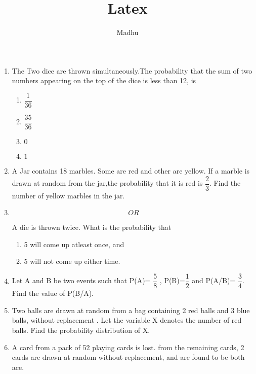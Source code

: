 \documentclass[a4paper,12pt]{article}
\begin{document}
\title{Latex}
\author{Madhu}
\maketitle
{}

\begin{enumerate}

\item The Two dice are thrown simultaneously.The probability that the sum of two numbers appearing on the top of the dice is less than 12, is

\begin{enumerate}
\item $ \dfrac{1}{36} $ \\
\item $ \dfrac{35}{36} $ \\
\item $ 0 $\\
\item $ 1 $\\
\end{enumerate}


\item A Jar contains 18 marbles. Some are red and other are yellow. If a marble is drawn at random from the jar,the probability that it is red is $ \dfrac{2}{3} $. Find the number of yellow marbles in the jar.

\item [ ]$$ OR $$

A die is thrown twice. What is the probability that 
\begin{enumerate}
\item 5 will come up atleast once, and
\item 5 will not come up either time.
\end{enumerate}

\item Let A and B be two events such that P(A)= $ \dfrac{5}{8} $ , P(B)=$ \dfrac{1}{2} $ and P(A/B)= $\dfrac{3}{4} $. Find the value of P(B/A).

\item Two balls are drawn at random from a bag containing 2 red balls and 3 blue balls, without replacement . Let the variable X denotes the number of red balls. Find the probability distribution of X.

\item A card from a pack of 52 playing cards is lost. from the remaining cards, 2 cards are drawn at random without replacement, and are found to be both ace.


\end{enumerate}
\end{document}
